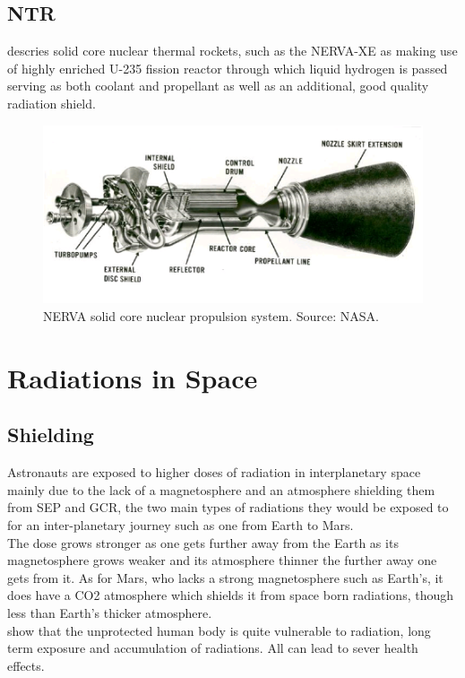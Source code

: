\documentclass[12pt,a4paper]{report}
\begin{document}
\subsection{NTR}
\citet{finseth1991} descries solid core nuclear thermal rockets, such as the NERVA-XE as making use of highly enriched U-235 fission reactor through which liquid hydrogen is passed serving as both coolant and propellant as well as an additional, good quality radiation shield.
\begin{figure}[hbtp]
\centering
\includegraphics[scale=.7]{img/NERVA-solid-core-nuclear-propulsion-system.png}
\caption{NERVA solid core nuclear propulsion system. Source:
NASA.}
\end{figure}




\newpage

\section{Radiations in Space}


\subsection{Shielding}
Astronauts are exposed to higher doses of radiation in interplanetary space mainly due to the lack of a magnetosphere and an atmosphere shielding them from SEP and GCR, the two main types of radiations they would be exposed to for an inter-planetary journey such as one from Earth to Mars. \\
The dose grows stronger as one gets further away from the Earth as its magnetosphere grows weaker and its atmosphere thinner the further away one gets from it.
As for Mars, who lacks a strong magnetosphere such as Earth's, it does have a CO2 atmosphere which shields it from space born radiations, though less than Earth's thicker atmosphere.\\
\citet{baumstark2002life} \citet{cucinotta2009} show that the unprotected human body is quite vulnerable to radiation, long term exposure and accumulation of radiations. All can lead to sever health effects.\\
\end{document}
